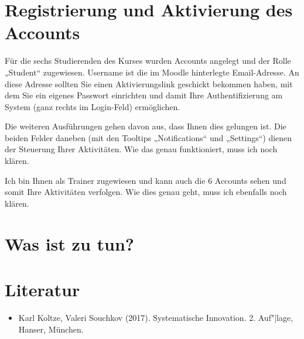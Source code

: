 \documentclass[11pt,a4paper]{article}
\begin{document}
\section{Registrierung und Aktivierung des Accounts}

Für die sechs Studierenden des Kurses wurden Accounts angelegt und der Rolle
„Student“ zugewiesen. Username ist die im Moodle hinterlegte Email-Adresse.
An diese Adresse sollten Sie einen Aktivierungslink geschickt bekommen haben,
mit dem Sie ein eigenes Passwort einrichten und damit Ihre Authentifizierung
am System (ganz rechts im Login-Feld) ermöglichen.  

Die weiteren Ausführungen gehen davon aus, dass Ihnen dies gelungen ist.  Die
beiden Felder daneben (mit den Tooltips „Notifications“ und „Settings“) dienen
der Steuerung Ihrer Aktivitäten. Wie das genau funktioniert, muss ich noch
klären.

Ich bin Ihnen als Trainer zugewiesen und kann auch die 6 Accounts sehen und
somit Ihre Aktivitäten verfolgen. Wie dies genau geht, muss ich ebenfalls noch
klären. 

\section{Was ist zu tun?}




\section{Literatur}

\begin{itemize}
\item Karl Koltze, Valeri Souchkov (2017). Systematische Innovation.
  2. Auf"|lage, Hanser, München.
\end{itemize}
\end{document}
